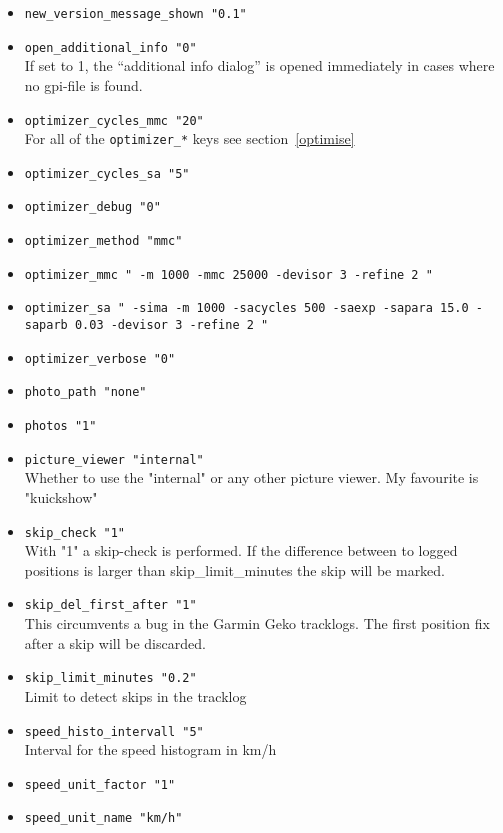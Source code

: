 \begin{itemize}
\item \texttt{new\_version\_message\_shown    "0.1"}

\item \texttt{open\_additional\_info    "0"}\\
    If set to 1, the ``additional info dialog'' is opened immediately in cases where no gpi-file is found.


\item \texttt{optimizer\_cycles\_mmc    "20"} \\
	For all of the \texttt{optimizer\_*} keys see section~\ref{optimise}
\item \texttt{optimizer\_cycles\_sa    "5"}
\item \texttt{optimizer\_debug    "0"}
\item \texttt{optimizer\_method    "mmc"}
\item \texttt{optimizer\_mmc    " -m 1000 -mmc 25000 -devisor 3 -refine 2 "}
\item \texttt{optimizer\_sa    " -sima -m 1000 -sacycles 500 -saexp -sapara 15.0 -saparb 0.03 -devisor 3 -refine 2 "}
\item \texttt{optimizer\_verbose    "0"}


\item \texttt{photo\_path    "none"}
\item \texttt{photos    "1"}
\item \texttt{picture\_viewer    "internal"}\\
    Whether to use the "internal" or any other picture viewer. My favourite is "kuickshow"
\item \texttt{skip\_check    "1"}\\
    With "1" a skip-check is performed. If the difference between to logged positions is larger than
    skip\_limit\_minutes the skip will be marked.
\item \texttt{skip\_del\_first\_after    "1"} \\
	This circumvents a bug in the Garmin Geko tracklogs. The first position fix after a skip will be discarded.
\item \texttt{skip\_limit\_minutes    "0.2"}\\
    Limit to detect skips in the tracklog
\item \texttt{speed\_histo\_intervall    "5"}\\
    Interval for the speed histogram in km/h
\item \texttt{speed\_unit\_factor    "1"}
\item \texttt{speed\_unit\_name    "km/h"}


\end{itemize}

